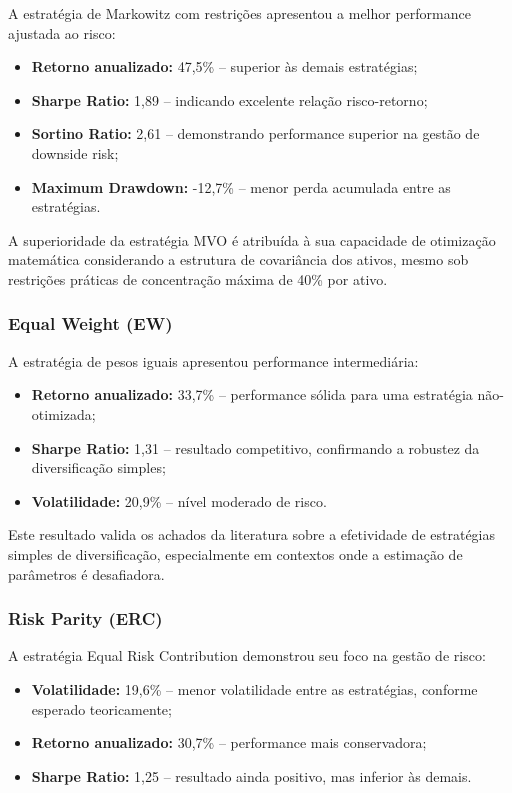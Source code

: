 A estratégia de Markowitz com restrições apresentou a melhor performance ajustada ao risco:

\begin{itemize}
    \item \textbf{Retorno anualizado:} 47,5\% -- superior às demais estratégias;
    \item \textbf{Sharpe Ratio:} 1,89 -- indicando excelente relação risco-retorno;
    \item \textbf{Sortino Ratio:} 2,61 -- demonstrando performance superior na gestão de downside risk;
    \item \textbf{Maximum Drawdown:} -12,7\% -- menor perda acumulada entre as estratégias.
\end{itemize}

A superioridade da estratégia MVO é atribuída à sua capacidade de otimização matemática considerando a estrutura de covariância dos ativos, mesmo sob restrições práticas de concentração máxima de 40\% por ativo.

\subsubsection{Equal Weight (EW)}

A estratégia de pesos iguais apresentou performance intermediária:

\begin{itemize}
    \item \textbf{Retorno anualizado:} 33,7\% -- performance sólida para uma estratégia não-otimizada;
    \item \textbf{Sharpe Ratio:} 1,31 -- resultado competitivo, confirmando a robustez da diversificação simples;
    \item \textbf{Volatilidade:} 20,9\% -- nível moderado de risco.
\end{itemize}

Este resultado valida os achados da literatura sobre a efetividade de estratégias simples de diversificação, especialmente em contextos onde a estimação de parâmetros é desafiadora.

\subsubsection{Risk Parity (ERC)}

A estratégia Equal Risk Contribution demonstrou seu foco na gestão de risco:

\begin{itemize}
    \item \textbf{Volatilidade:} 19,6\% -- menor volatilidade entre as estratégias, conforme esperado teoricamente;
    \item \textbf{Retorno anualizado:} 30,7\% -- performance mais conservadora;
    \item \textbf{Sharpe Ratio:} 1,25 -- resultado ainda positivo, mas inferior às demais.
\end{itemize}

